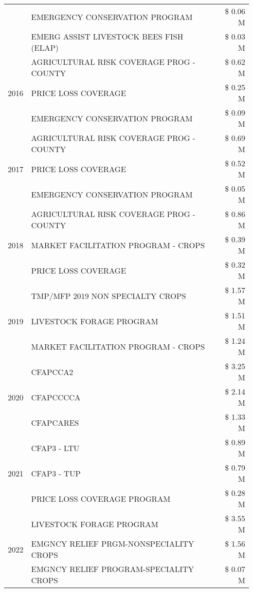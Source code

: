\begin{tabular}{llr}
 & EMERGENCY CONSERVATION PROGRAM & \$ 0.06 M \\
 & EMERG ASSIST LIVESTOCK BEES FISH (ELAP) & \$ 0.03 M \\
\cline{1-3}
\multirow[t]{3}{*}{2016} & AGRICULTURAL RISK COVERAGE PROG - COUNTY & \$ 0.62 M \\
 & PRICE LOSS COVERAGE & \$ 0.25 M \\
 & EMERGENCY CONSERVATION PROGRAM & \$ 0.09 M \\
\cline{1-3}
\multirow[t]{3}{*}{2017} & AGRICULTURAL RISK COVERAGE PROG - COUNTY & \$ 0.69 M \\
 & PRICE LOSS COVERAGE & \$ 0.52 M \\
 & EMERGENCY CONSERVATION PROGRAM & \$ 0.05 M \\
\cline{1-3}
\multirow[t]{3}{*}{2018} & AGRICULTURAL RISK COVERAGE PROG - COUNTY & \$ 0.86 M \\
 & MARKET FACILITATION PROGRAM - CROPS & \$ 0.39 M \\
 & PRICE LOSS COVERAGE & \$ 0.32 M \\
\cline{1-3}
\multirow[t]{3}{*}{2019} & TMP/MFP 2019 NON SPECIALTY CROPS & \$ 1.57 M \\
 & LIVESTOCK FORAGE PROGRAM & \$ 1.51 M \\
 & MARKET FACILITATION PROGRAM - CROPS & \$ 1.24 M \\
\cline{1-3}
\multirow[t]{3}{*}{2020} & CFAPCCA2 & \$ 3.25 M \\
 & CFAPCCCCA & \$ 2.14 M \\
 & CFAPCARES & \$ 1.33 M \\
\cline{1-3}
\multirow[t]{3}{*}{2021} & CFAP3 - LTU & \$ 0.89 M \\
 & CFAP3 - TUP & \$ 0.79 M \\
 & PRICE LOSS COVERAGE PROGRAM & \$ 0.28 M \\
\cline{1-3}
\multirow[t]{3}{*}{2022} & LIVESTOCK FORAGE PROGRAM & \$ 3.55 M \\
 & EMGNCY RELIEF PRGM-NONSPECIALITY CROPS & \$ 1.56 M \\
 & EMGNCY RELIEF PROGRAM-SPECIALITY CROPS & \$ 0.07 M \\
\cline{1-3}
\bottomrule
\end{tabular}

